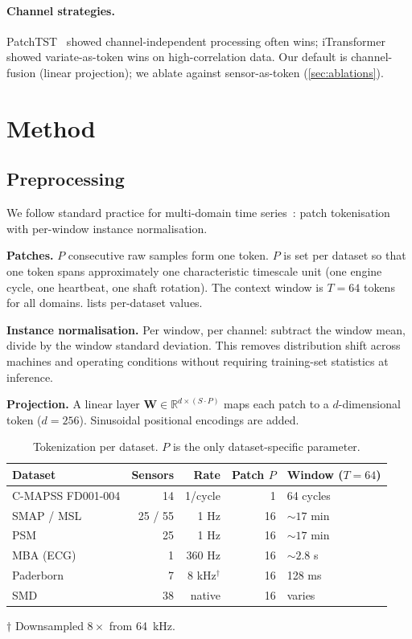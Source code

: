 \documentclass{article}
\newcommand{\R}{\mathbb{R}}
\newcommand{\W}{\mathbf{W}}
\begin{document}
\paragraph{Channel strategies.}
PatchTST~\citep{nie2023patchtst} showed channel-independent processing often wins; iTransformer~\citep{liu2024itransformer} showed variate-as-token wins on high-correlation data. Our default is channel-fusion (linear projection); we ablate against sensor-as-token (\cref{sec:ablations}).

\section{Method}
\label{sec:method}

\subsection{Preprocessing}
\label{sec:preprocessing}

We follow standard practice for multi-domain time series~\citep{nie2023patchtst,ansari2024chronos,goswami2024moment}: patch tokenisation with per-window instance normalisation.

\textbf{Patches.} $P$ consecutive raw samples form one token. $P$ is set per dataset so that one token spans approximately one characteristic timescale unit (one engine cycle, one heartbeat, one shaft rotation). The context window is $T{=}64$ tokens for all domains.  lists per-dataset values.

\textbf{Instance normalisation.} Per window, per channel: subtract the window mean, divide by the window standard deviation. This removes distribution shift across machines and operating conditions without requiring training-set statistics at inference.

\textbf{Projection.} A linear layer $\W \in \R^{d \times (S \cdot P)}$ maps each patch to a $d$-dimensional token ($d{=}256$). Sinusoidal positional encodings are added.

\begin{table}[h]
\centering
\caption{Tokenization per dataset. $P$ is the only dataset-specific parameter.}
\label{tab:tokenization}
\small
\begin{tabular}{@{}lrrrl@{}}
\toprule
Dataset & Sensors & Rate & Patch $P$ & Window ($T{=}64$) \\
\midrule
C-MAPSS FD001-004 & 14 & 1/cycle & 1 & 64 cycles \\
SMAP / MSL & 25 / 55 & 1 Hz & 16 & ${\sim}17$ min \\
PSM & 25 & 1 Hz & 16 & ${\sim}17$ min \\
MBA (ECG) & 1 & 360 Hz & 16 & ${\sim}2.8$ s \\
Paderborn & 7 & 8 kHz$^\dagger$ & 16 & 128 ms \\
SMD & 38 & native & 16 & varies \\
\bottomrule
\end{tabular}
{\footnotesize\par $\dagger$ Downsampled $8\times$ from 64~kHz.}
\end{table}
\end{document}

